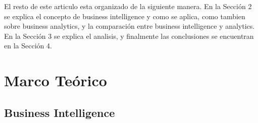 \documentclass[%
 reprint,
 amsmath,amssymb,
 aps,
]{revtex4-1}
\begin{document}
\par El resto de este articulo esta organizado de la siguiente manera. En la Sección 2 se explica el concepto de business intelligence y como se aplica, como tambien sobre business analytics, y la comparación entre business intelligence y analytics. En la Sección 3 se explica el analisis, y finalmente las conclusiones se encuentran en la Sección 4.


\section {Marco Teórico}

\subsection{Business Intelligence}
\end{document}
